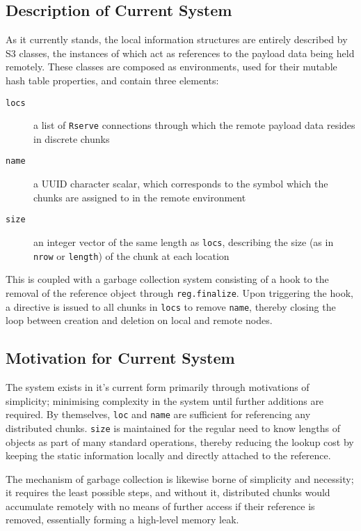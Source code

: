 \documentclass[a4paper]{article}
\begin{document}
\subsection{Description of Current System}
As it currently stands, the local information structures are entirely described
by S3 classes, the instances of which act as references to the payload data
being held remotely.
These classes are composed as environments, used for their mutable hash table
properties, and contain three elements:
\begin{description}
	\item[\texttt{locs}] a list of \texttt{Rserve} connections through
		which the remote payload data resides in discrete chunks
	\item[\texttt{name}] a UUID character scalar, which corresponds to the
		symbol which the chunks are assigned to in the remote
		environment
	\item[\texttt{size}] an integer vector of the same length as
		\texttt{locs}, describing the size (as in \texttt{nrow} or
		\texttt{length}) of the chunk at each location
\end{description}
This is coupled with a garbage collection system consisting of a hook to the
removal of the reference object through \texttt{reg.finalize}.
Upon triggering the hook, a directive is issued to all chunks in \texttt{locs}
to remove \texttt{name}, thereby closing the loop between creation and deletion
on local and remote nodes.

\subsection{Motivation for Current System}
The system exists in it's current form primarily through motivations of
simplicity; minimising complexity in the system until further additions are
required.
By themselves, \texttt{loc} and \texttt{name} are sufficient for referencing
any distributed chunks.
\texttt{size} is maintained for the regular need to know lengths of objects as
part of many standard operations, thereby reducing the lookup cost by keeping
the static information locally and directly attached to the reference.

The mechanism of garbage collection is likewise borne of simplicity and
necessity; it requires the least possible steps, and without it, distributed
chunks would accumulate remotely with no means of further access if their
reference is removed, essentially forming a high-level memory leak.
\end{document}
